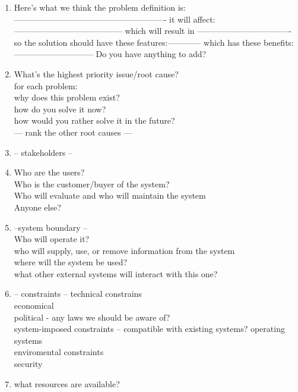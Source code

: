 \documentclass[letterpaper]{article}
\begin{document}
\begin{enumerate}
       
 \item Here's what we think the problem definition is:
       -------------------------------------------------------
       it will affect: ---------------------------------------
       which will result in ----------------------------------
       so the solution should have these features:------------
       which has these benefits: -----------------------------
       Do you have anything to add?
 \item What's the highest priority issue/root cause? \\
       for each problem: \\
       why does this problem exist?\\
       how do you solve it now?\\
       how would you rather solve it in the future?\\
       --- rank the other root causes ---
 \item -- stakeholders --
 \item Who are the users?\\
       Who is the customer/buyer of the system?\\
       Who will evaluate and who will maintain the system\\
       Anyone else?
 \item --system boundary --\\
       Who will operate it?\\
       who will supply, use, or remove information from the system\\
       where will the system be used?\\
       what other external systems will interact with this one?\\
 \item -- constraints --
       technical constrains\\
       economical\\
       political - any laws we should be aware of?\\
       system-imposed constraints -- compatible with existing systems? operating systems\\
       enviromental constraints\\
       security\\
 \item what resources are available?
\end{enumerate}
\end{document}
